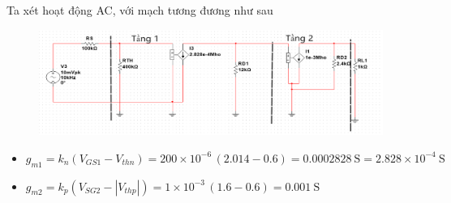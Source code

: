 Ta xét hoạt động AC, với mạch tương đương như sau

\begin{figure}[H]
	\centering
	\includegraphics[width=.8\linewidth]{./my-chapters/my-images/Question8/b_mohinhtuongduong.png}
\end{figure}

\begin{itemize}[label=+, leftmargin=2cm]
	\item \( g_{m1} = k_n (V_{GS1} - V_{thn})
	= 200\times 10^{-6}\,(2.014-0.6)
	= 0.0002828\ \text{S}
	= 2.828\times 10^{-4}\ \text{S} \)
	\item \( g_{m2} = k_p (V_{SG2} - |V_{thp}|)
	= 1\times 10^{-3}\,(1.6-0.6)
	= 0.001\ \text{S} \)
\end{itemize}


